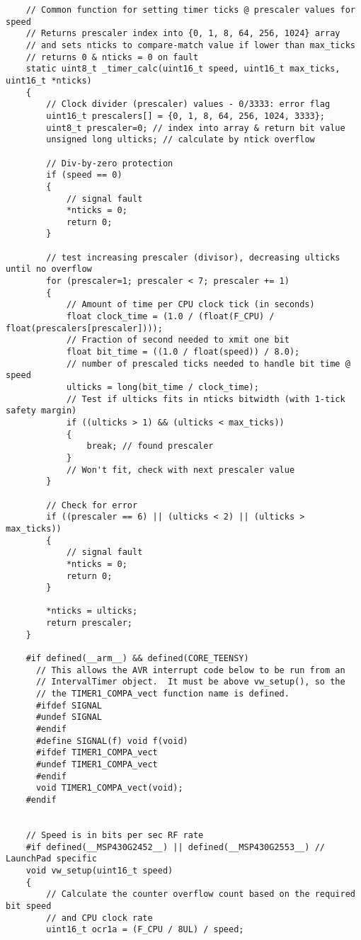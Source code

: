 \begin{verbatim}
    // Common function for setting timer ticks @ prescaler values for speed
    // Returns prescaler index into {0, 1, 8, 64, 256, 1024} array
    // and sets nticks to compare-match value if lower than max_ticks
    // returns 0 & nticks = 0 on fault
    static uint8_t _timer_calc(uint16_t speed, uint16_t max_ticks, uint16_t *nticks)
    {
        // Clock divider (prescaler) values - 0/3333: error flag
        uint16_t prescalers[] = {0, 1, 8, 64, 256, 1024, 3333};
        uint8_t prescaler=0; // index into array & return bit value
        unsigned long ulticks; // calculate by ntick overflow

        // Div-by-zero protection
        if (speed == 0)
        {
            // signal fault
            *nticks = 0;
            return 0;
        }

        // test increasing prescaler (divisor), decreasing ulticks until no overflow
        for (prescaler=1; prescaler < 7; prescaler += 1)
        {
            // Amount of time per CPU clock tick (in seconds)
            float clock_time = (1.0 / (float(F_CPU) / float(prescalers[prescaler])));
            // Fraction of second needed to xmit one bit
            float bit_time = ((1.0 / float(speed)) / 8.0);
            // number of prescaled ticks needed to handle bit time @ speed
            ulticks = long(bit_time / clock_time);
            // Test if ulticks fits in nticks bitwidth (with 1-tick safety margin)
            if ((ulticks > 1) && (ulticks < max_ticks))
            {
                break; // found prescaler
            }
            // Won't fit, check with next prescaler value
        }

        // Check for error
        if ((prescaler == 6) || (ulticks < 2) || (ulticks > max_ticks))
        {
            // signal fault
            *nticks = 0;
            return 0;
        }

        *nticks = ulticks;
        return prescaler;
    }

    #if defined(__arm__) && defined(CORE_TEENSY)
      // This allows the AVR interrupt code below to be run from an
      // IntervalTimer object.  It must be above vw_setup(), so the
      // the TIMER1_COMPA_vect function name is defined.
      #ifdef SIGNAL
      #undef SIGNAL
      #endif
      #define SIGNAL(f) void f(void)
      #ifdef TIMER1_COMPA_vect
      #undef TIMER1_COMPA_vect
      #endif
      void TIMER1_COMPA_vect(void);
    #endif


    // Speed is in bits per sec RF rate
    #if defined(__MSP430G2452__) || defined(__MSP430G2553__) // LaunchPad specific
    void vw_setup(uint16_t speed)
    {
        // Calculate the counter overflow count based on the required bit speed
        // and CPU clock rate
        uint16_t ocr1a = (F_CPU / 8UL) / speed;
            

\end{verbatim}
